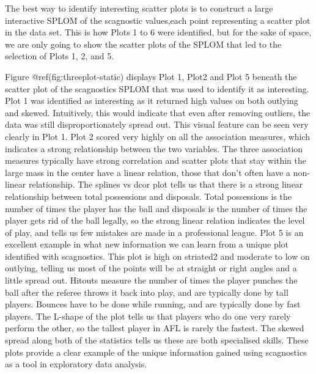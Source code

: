 The best way to identify interesting scatter plots is to construct a
large interactive SPLOM of the scagnostic values,each point representing
a scatter plot in the data set. This is how Plots 1 to 6 were
identified, but for the sake of space, we are only going to show the
scatter plots of the SPLOM that led to the selection of Plots 1, 2, and
5.

Figure @ref(fig:threeplot-static) displays Plot 1, Plot2 and Plot 5
beneath the scatter plot of the scagnostics SPLOM that was used to
identify it as interesting. Plot 1 was identified as interesting as it
returned high values on both outlying and skewed. Intuitively, this
would indicate that even after removing outliers, the data was still
disproportionately spread out. This visual feature can be seen very
clearly in Plot 1. Plot 2 scored very highly on all the association
measures, which indicates a strong relationship between the two
variables. The three association measures typically have strong
correlation and scatter plots that stay within the large mass in the
center have a linear relation, those that don't often have a non-linear
relationship. The splines vs dcor plot tells us that there is a strong
linear relationship between total possessions and disposals. Total
possessions is the number of times the player has the ball and disposals
is the number of times the player gets rid of the ball legally, so the
strong linear relation indicates the level of play, and tells us few
mistakes are made in a professional league. Plot 5 is an excellent
example in what new information we can learn from a unique plot
identified with scagnostics. This plot is high on striated2 and moderate
to low on outlying, telling us most of the points will be at straight or
right angles and a little spread out. Hitouts measure the number of
times the player punches the ball after the referee throws it back into
play, and are typically done by tall players. Bounces have to be done
while running, and are typically done by fast players. The L-shape of
the plot tells us that players who do one very rarely perform the other,
so the tallest player in AFL is rarely the fastest. The skewed spread
along both of the statistics tells us these are both specialised skills.
These plots provide a clear example of the unique information gained
using scagnostics as a tool in exploratory data analysis.

